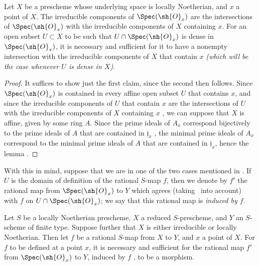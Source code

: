 \begin{lemma}[7.2.8.1]
\label{I.7.2.8.1}
Let $X$ be a prescheme whose underlying space is locally Noetherian, and $x$ a point of $X$.
The irreducible components of $\Spec(\sh{O}_x)$ are the intersections of $\Spec(\sh{O}_x)$ with the irreducible components of $X$ containing $x$.
For an open subset $U\subset X$ to be such that $U\cap\Spec(\sh{O}_x)$ is dense in $\Spec(\sh{O}_x)$, it is necessary and sufficient for it to have a nonempty intersection with the irreducible components of $X$ that contain $x$ \emph{(which will be the case whenever $U$ is \emph{dense} in $X$)}.
\end{lemma}

\begin{proof}
It suffices to show just the first claim, since the second then follows.
Since $\Spec(\sh{O}_x)$ is contained in every affine open subset $U$ that contains $x$, and since the irreducible components of $U$ that contain $x$ are the intersections of $U$ with the irreducible components of $X$ containing $x$ , we can suppose that $X$ is affine, given by some ring $A$.
Since the prime ideals of $A_x$ correspond bijectively to the prime ideals of $A$ that are
contained in $\mathfrak{j}_x$ , the minimal prime ideals of $A_x$ correspond to the minimal prime ideals of $A$ that are contained in $\mathfrak{j}_x$, hence the lemma .
\end{proof}

With this in mind, suppose that we are in one of the two cases mentioned in .
If $U$ is the domain of definition of the rational $S$-map $f$, then we denote by $f'$ the rational map from $\Spec(\sh{O}_x)$ to $Y$ which agrees (taking~ into account) with $f$ on $U\cap\Spec(\sh{O}_x)$; we say that this rational map is \emph{induced by $f$}.

\begin{proposition}[7.2.9]
\label{I.7.2.9}
Let $S$ be a locally Noetherian prescheme, $X$ a reduced $S$-prescheme, and $Y$ an $S$-scheme of finite type.
Suppose further that $X$ is either irreducible or locally Noetherian.
Then let $f$ be a rational $S$-map from $X$ to $Y$, and $x$ a point of $X$.
For $f$ to be defined at a point $x$, it is necessary and sufficient for the rational map $f'$ from $\Spec(\sh{O}_x)$ to $Y$, induced by $f$ , to be a morphism.
\end{proposition}

